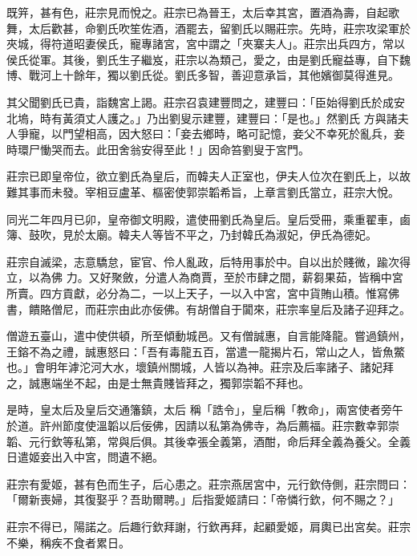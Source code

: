 \begin{pinyinscope}
 既笄，甚有色，莊宗見而悅之。莊宗已為晉王，太后幸其宮，置酒為壽，自起歌舞，太后歡甚，命劉氏吹笙佐酒，酒罷去，留劉氏以賜莊宗。先時，莊宗攻梁軍於夾城，得符道昭妻侯氏，寵專諸宮，宮中謂之「夾寨夫人」。莊宗出兵四方，常以侯氏從軍。其後，劉氏生子繼岌，莊宗以為類己，愛之，由是劉氏寵益專，自下魏博、戰河上十餘年，獨以劉氏從。劉氏多智，善迎意承旨，其他嬪御莫得進見。



 其父聞劉氏已貴，詣魏宮上謁。莊宗召袁建豐問之，建豐曰：「臣始得劉氏於成安北塢，時有黃須丈人護之。」乃出劉叟示建豐，建豐曰：「是也。」然劉氏
 方與諸夫人爭寵，以門望相高，因大怒曰：「妾去鄉時，略可記憶，妾父不幸死於亂兵，妾時環尸慟哭而去。此田舍翁安得至此！」因命笞劉叟于宮門。



 莊宗已即皇帝位，欲立劉氏為皇后，而韓夫人正室也，伊夫人位次在劉氏上，以故難其事而未發。宰相豆盧革、樞密使郭崇韜希旨，上章言劉氏當立，莊宗大悅。



 同光二年四月已卯，皇帝御文明殿，遣使冊劉氏為皇后。皇后受冊，乘重翟車，鹵簿、鼓吹，見於太廟。韓夫人等皆不平之，乃封韓氏為淑妃，伊氏為德妃。



 莊宗自滅梁，志意驕怠，宦官、伶人亂政，后特用事於中。自以出於賤微，踰次得立，以為佛
 力。又好聚斂，分遣人為商賈，至於市肆之間，薪芻果茹，皆稱中宮所賣。四方貢獻，必分為二，一以上天子，一以入中宮，宮中貨賄山積。惟寫佛書，饋賂僧尼，而莊宗由此亦佞佛。有胡僧自于闐來，莊宗率皇后及諸子迎拜之。



 僧遊五臺山，遣中使供頓，所至傾動城邑。又有僧誠惠，自言能降龍。嘗過鎮州，王鎔不為之禮，誠惠怒曰：「吾有毒龍五百，當遣一龍揭片石，常山之人，皆魚鱉也。」會明年滹沱河大水，壞鎮州關城，人皆以為神。莊宗及后率諸子、諸妃拜之，誠惠端坐不起，由是士無貴賤皆拜之，獨郭崇韜不拜也。



 是時，皇太后及皇后交通籓鎮，太后
 稱「誥令」，皇后稱「教命」，兩宮使者旁午於道。許州節度使溫韜以后佞佛，因請以私第為佛寺，為后薦福。莊宗數幸郭崇韜、元行欽等私第，常與后俱。其後幸張全義第，酒酣，命后拜全義為養父。全義日遣姬妾出入中宮，問遺不絕。



 莊宗有愛姬，甚有色而生子，后心患之。莊宗燕居宮中，元行欽侍側，莊宗問曰：「爾新喪婦，其復娶乎？吾助爾聘。」后指愛姬請曰：「帝憐行欽，何不賜之？」



 莊宗不得已，陽諾之。后趣行欽拜謝，行欽再拜，起顧愛姬，肩輿已出宮矣。莊宗不樂，稱疾不食者累日。




\end{pinyinscope}
